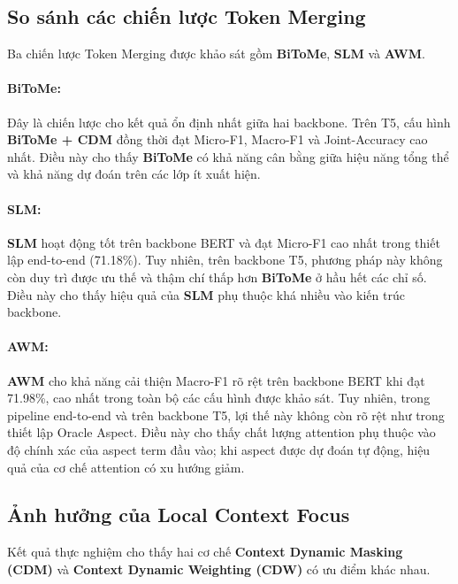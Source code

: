 \subsection{So sánh các chiến lược Token Merging}

Ba chiến lược Token Merging được khảo sát gồm \textbf{BiToMe},
\textbf{SLM} và \textbf{AWM}.

\paragraph{\textbf{BiToMe}:}

Đây là chiến lược cho kết quả ổn định nhất giữa hai backbone.
Trên T5, cấu hình \textbf{BiToMe + CDM} đồng thời đạt Micro-F1, Macro-F1 và
Joint-Accuracy cao nhất.
Điều này cho thấy \textbf{BiToMe} có khả năng cân bằng giữa hiệu năng
tổng thể và khả năng dự đoán trên các lớp ít xuất hiện.

\paragraph{\textbf{SLM}:}

\textbf{SLM} hoạt động tốt trên backbone BERT và đạt
Micro-F1 cao nhất trong thiết lập end-to-end (71.18\%).
Tuy nhiên, trên backbone T5, phương pháp này không còn duy trì được ưu
thế và thậm chí thấp hơn \textbf{BiToMe} ở hầu hết các chỉ số.
Điều này cho thấy hiệu quả của \textbf{SLM} phụ thuộc khá
nhiều vào kiến trúc backbone.

\paragraph{\textbf{AWM}:}

\textbf{AWM} cho khả năng cải thiện Macro-F1 rõ rệt trên
backbone BERT khi đạt 71.98\%, cao nhất trong toàn bộ các cấu hình
được khảo sát.
Tuy nhiên, trong pipeline end-to-end và trên backbone T5, lợi thế này
không còn rõ rệt như trong thiết lập Oracle Aspect.
Điều này cho thấy chất lượng attention phụ thuộc vào độ chính xác của
aspect term đầu vào; khi aspect được dự đoán tự động, hiệu quả của cơ
chế attention có xu hướng giảm.

\subsection{Ảnh hưởng của Local Context Focus}

Kết quả thực nghiệm cho thấy hai cơ chế \textbf{Context Dynamic Masking (CDM)}
và \textbf{Context Dynamic Weighting (CDW)} có ưu điểm khác nhau.

